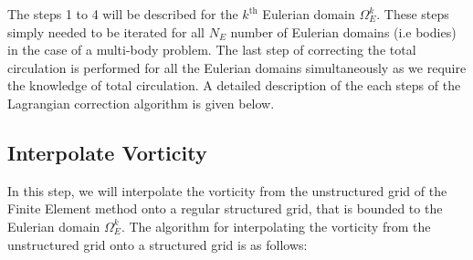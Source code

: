 	The steps 1 to 4 will be described for the $k^{\mathrm{th}}$ Eulerian domain $\Omega_E^k$. These steps simply needed to be iterated for all $N_E$ number of Eulerian domains (i.e bodies) in the case of a multi-body problem. The last step of correcting the total circulation is performed for all the Eulerian domains simultaneously as we require the knowledge of total circulation. A detailed description of the each steps of the Lagrangian correction algorithm is given below.
	
	
	
	\subsection{Interpolate Vorticity}
	\label{subsec:coupling-iv}
	In this step, we will interpolate the vorticity from the unstructured grid of the Finite Element method onto a regular structured grid, that is bounded to the Eulerian domain $\Omega_E^k$. The algorithm for interpolating the vorticity from the unstructured grid onto a structured grid is as follows:


